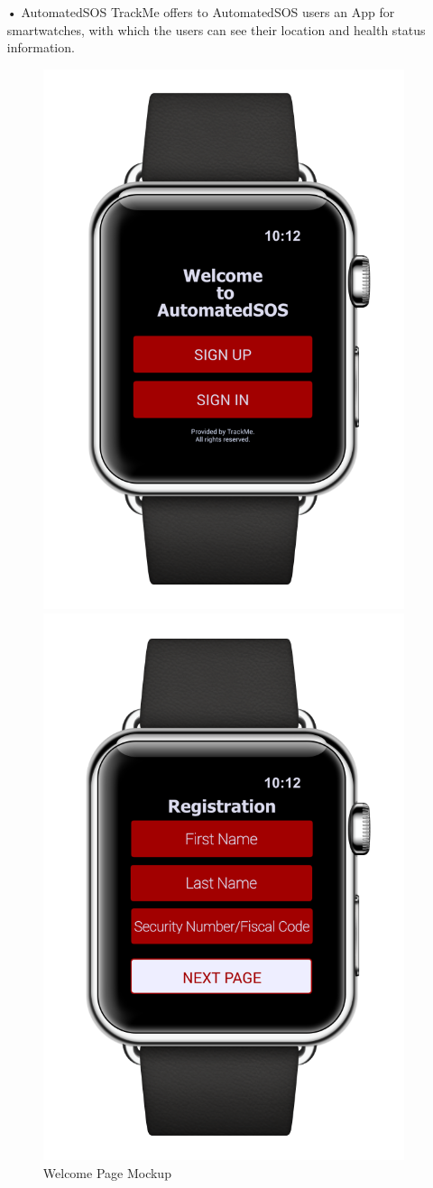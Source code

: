 \begin{enumerate}
\item[•]{\Large AutomatedSOS}
\bigbreak
\noindent
TrackMe offers to AutomatedSOS users an App for smartwatches, with which the users can see their location and health status information.
\begin{figure}[H]
\begin{center}
        \begin{minipage}[c]{.40\textwidth}
        \centering
          \includegraphics[height=12 cm]{Images/Mockups/AutomatedSOSMockup1.png}
          	\caption{Welcome Page Mockup}
        \end{minipage}%
        \hspace{10mm}%
        \begin{minipage}[c]{.40\textwidth}
        \centering
          \includegraphics[height=12 cm]{Images/Mockups/AutomatedSOSMockup6.png}

\end{minipage}
\end{center}
\end{figure}
\end{enumerate}
